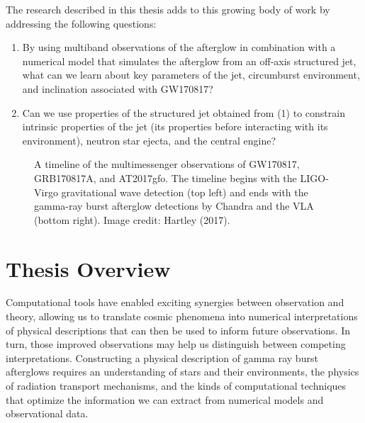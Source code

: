 \documentclass[1.5,11pt]{beavtex}
\begin{document}
The research described in this thesis adds to this growing body of work by addressing the following questions: 

\begin{enumerate}
    \item By using multiband observations of the afterglow in combination with a numerical model that simulates the afterglow from an off-axis structured jet, what can we learn about key parameters of the jet, circumburst environment, and inclination associated with GW170817?  
    \item Can we use properties of the structured jet obtained from (1) to constrain intrinsic properties of the jet (its properties before interacting with its environment), neutron star ejecta, and the central engine? 
\end{enumerate}

\begin{figure}[htbp!]
  \centering
  \def\svgscale{0.3}
  
  \caption{\selectfont A timeline of the multimessenger observations of GW170817, GRB170817A, and AT2017gfo. The timeline begins with the LIGO-Virgo gravitational wave detection (top left) and ends with the gamma-ray burst afterglow detections by Chandra and the VLA (bottom right).  Image credit: Hartley (2017).}
  \label{fig: multiwavelength}
\end{figure}
\pagebreak[4]
\clearpage

\section{Thesis Overview} \label{ch:Intro sec:Thesis overview}

Computational tools have enabled exciting synergies between observation and theory, allowing us to translate cosmic phenomena into numerical interpretations of physical descriptions that can then be used to inform future observations. In turn, those improved observations may help us distinguish between competing interpretations. Constructing a physical description of gamma ray burst afterglows requires an understanding of stars and their environments, the physics of radiation transport mechanisms, and the kinds of computational techniques that optimize the information we can extract from numerical models and observational data.
\end{document}
